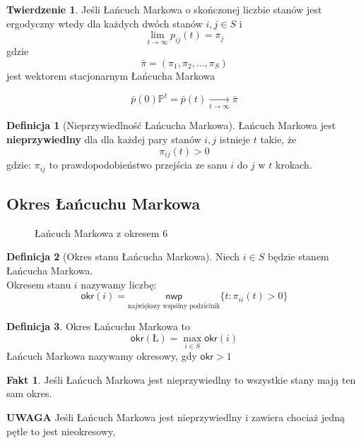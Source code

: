 \documentclass[a4paper,12pt]{article}
\theoremstyle{definition}%
\newtheorem{theorem}{Twierdzenie}%
\newtheorem*{fact*}{Fakt} %
\theoremstyle{definition}
\newtheorem{definition}{Definicja}%
\theoremstyle{problem}
\begin{document}
\begin{theorem}
Jeśli Łańcuch Markowa o skończonej liczbie stanów jest ergodyczny wtedy dla każdych dwóch stanów $i,j\in S$ i $$\lim _{t\rightarrow \infty }p_{ij}(t)=\pi _j$$ gdzie $$\bar{\pi}=(\pi _1,\pi _2,...,\pi _S)$$ jest wektorem stacjonarnym Łańcucha Markowa
\end{theorem}

$$\bar{p}(0)\mathbb{P}^t=\bar{p}(t)\underset{t\rightarrow \infty}{\rightarrow}\bar{\pi}$$

\begin{definition}[Nieprzywiedlność Łańcucha Markowa]\label{def:NieprzywiedlnoscLM}
Łańcuch Markowa jest \textbf{nieprzywiedlny} dla dla każdej pary stanów $i,j$ istnieje $t$ takie, że 
$$\pi _{ij}(t)>0$$ gdzie: $\pi _{ij}$ to prawdopodobieństwo przejścia ze sanu $i$ do $j$ w $t$ krokach.
\end{definition}

\subsection{Okres Łańcuchu Markowa}
\begin{figure}[H]
\centering
{}
\caption*{Łańcuch Markowa z okresem 6}
\end{figure}

\begin{definition}[Okres stanu Łańcucha Markowa]\label{def:OkresStanuLM}
Niech $i\in S$ będzie stanem Łańcucha Markowa.\\
Okresem stanu $i$ nazywamy liczbę:
$$\mathsf{okr}(i)=\underset{\text{największy wspólny podzielnik}}{\mathsf{nwp}}\{t: \pi _{ii}(t)>0\}$$
\end{definition}
\begin{definition}\label{def:OkresLM}
Okres Łańcuchu Markowa to
$$\mathsf{okr}(Ł)=\max _{i\in S} \mathsf{okr}(i)$$
Łańcuch Markowa nazywamy okresowy, gdy $\mathsf{okr}>1$
\end{definition}
\begin{fact*}\label{fac:OkresLM}
Jeśli Łańcuch Markowa jest nieprzywiedlny to wszystkie stany mają ten sam okres.
\end{fact*}
\textbf{UWAGA} Jeśli Łańcuch Markowa jest nieprzywiedlny i zawiera chociaż jedną pętle to jest nieokresowy,
\end{document}
